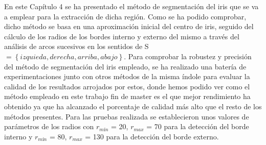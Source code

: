 En este Capítulo 4 se ha presentado el método de segmentación del iris que se va a emplear para la extracción de dicha región. Como se ha podido comprobar, dicho método se basa en una aproximación inicial del centro de iris, seguido del cálculo de los radios de los bordes interno y externo del mismo a través del análisis de arcos sucesivos en los sentidos de S $ = \left \{ \left. izquieda, derecha, arriba, abajo \right \} \right.$. Para comprobar la robustez y precisión del método de segmentación del iris empleado, se ha realizado una batería de experimentaciones junto con otros métodos de la misma índole para evaluar la calidad de los resultados arrojados por estos, donde hemos podido ver como el método empleado en este trabajo fin de master es el que mejor rendimiento ha obtenido ya que ha alcanzado el porcentaje de calidad más alto que el resto de los métodos presentes. Para las pruebas realizada se establecieron unos valores de parámetros de los radios con  $r_{mín}$ = 20, $r_{max}$ = 70 para la detección del borde interno y $r_{mín}$ = 80, $r_{max}$ = 130 para la detección del borde externo.\\

